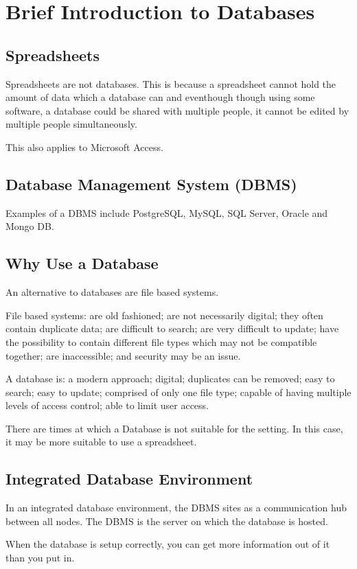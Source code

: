 \section*{Brief Introduction to Databases}

\subsection*{Spreadsheets}
Spreadsheets are not databases. This is because a spreadsheet cannot hold the amount of data which a database can and eventhough though using some software, a database could be shared with multiple people, it cannot be edited by multiple people simultaneously.

This also applies to Microsoft Access.

\subsection*{Database Management System (DBMS)}
Examples of a DBMS include PostgreSQL, MySQL, SQL Server, Oracle and Mongo DB.

\subsection*{Why Use a Database}
An alternative to databases are file based systems.

File based systems: are old fashioned; are not necessarily digital; they often contain duplicate data; are difficult to search; are very difficult to update; have the possibility to contain different file types which may not be compatible together; are inaccessible; and security may be an issue.

A database is: a modern approach; digital; duplicates can be removed; easy to search; easy to update; comprised of only one file type; capable of having multiple levels of access control; able to limit user access.

There are times at which a Database is not suitable for the setting. In this case, it may be more suitable to use a spreadsheet.

\subsection*{Integrated Database Environment}
In an integrated database environment, the DBMS sites as a communication hub between all nodes. The DBMS is the server on which the database is hosted.

When the database is setup correctly, you can get more information out of it than you put in.
